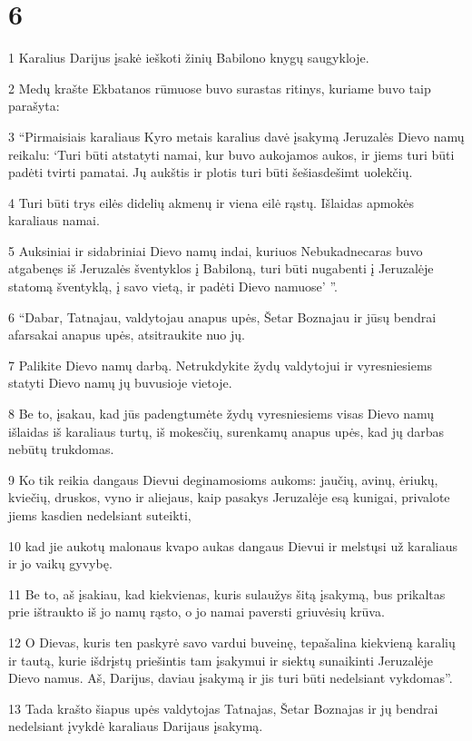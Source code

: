 \chapter{6}

\par 1 Karalius Darijus įsakė ieškoti žinių Babilono knygų saugykloje. 
\par 2 Medų krašte Ekbatanos rūmuose buvo surastas ritinys, kuriame buvo taip parašyta: 
\par 3 “Pirmaisiais karaliaus Kyro metais karalius davė įsakymą Jeruzalės Dievo namų reikalu: ‘Turi būti atstatyti namai, kur buvo aukojamos aukos, ir jiems turi būti padėti tvirti pamatai. Jų aukštis ir plotis turi būti šešiasdešimt uolekčių. 
\par 4 Turi būti trys eilės didelių akmenų ir viena eilė rąstų. Išlaidas apmokės karaliaus namai. 
\par 5 Auksiniai ir sidabriniai Dievo namų indai, kuriuos Nebukadnecaras buvo atgabenęs iš Jeruzalės šventyklos į Babiloną, turi būti nugabenti į Jeruzalėje statomą šventyklą, į savo vietą, ir padėti Dievo namuose’ ”. 
\par 6 “Dabar, Tatnajau, valdytojau anapus upės, Šetar Boznajau ir jūsų bendrai afarsakai anapus upės, atsitraukite nuo jų. 
\par 7 Palikite Dievo namų darbą. Netrukdykite žydų valdytojui ir vyresniesiems statyti Dievo namų jų buvusioje vietoje. 
\par 8 Be to, įsakau, kad jūs padengtumėte žydų vyresniesiems visas Dievo namų išlaidas iš karaliaus turtų, iš mokesčių, surenkamų anapus upės, kad jų darbas nebūtų trukdomas. 
\par 9 Ko tik reikia dangaus Dievui deginamosioms aukoms: jaučių, avinų, ėriukų, kviečių, druskos, vyno ir aliejaus, kaip pasakys Jeruzalėje esą kunigai, privalote jiems kasdien nedelsiant suteikti, 
\par 10 kad jie aukotų malonaus kvapo aukas dangaus Dievui ir melstųsi už karaliaus ir jo vaikų gyvybę. 
\par 11 Be to, aš įsakiau, kad kiekvienas, kuris sulaužys šitą įsakymą, bus prikaltas prie ištraukto iš jo namų rąsto, o jo namai paversti griuvėsių krūva. 
\par 12 O Dievas, kuris ten paskyrė savo vardui buveinę, tepašalina kiekvieną karalių ir tautą, kurie išdrįstų priešintis tam įsakymui ir siektų sunaikinti Jeruzalėje Dievo namus. Aš, Darijus, daviau įsakymą ir jis turi būti nedelsiant vykdomas”. 
\par 13 Tada krašto šiapus upės valdytojas Tatnajas, Šetar Boznajas ir jų bendrai nedelsiant įvykdė karaliaus Darijaus įsakymą. 
